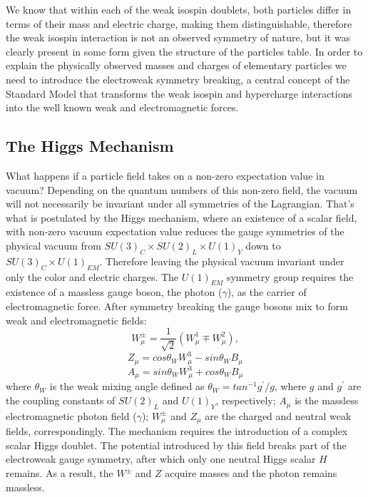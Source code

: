 We know that within each of the weak isospin doublets, both particles 
differ in terms of their
mass and electric charge, making them distinguishable,
 therefore the weak isospin interaction is
 not an observed symmetry of nature, but it was clearly present
in some form given the structure of the particles table. 
In order to explain the physically observed masses and charges of elementary
 particles we need to introduce the electroweak symmetry breaking, a central concept
of the Standard Model that transforms the
weak isospin and hypercharge interactions into the well known weak and electromagnetic forces.



\subsection{The Higgs Mechanism}

What happens if a particle field takes on a non-zero expectation value in vacuum? Depending on the
quantum numbers of this non-zero field, the vacuum will not necessarily be invariant under
all symmetries of the Lagrangian. That's what is postulated by the Higgs mechanism, where
an existence of a scalar field, with non-zero vacuum expectation value
reduces the gauge symmetries of the physical 
vacuum from $SU(3)_C \times SU(2)_L \times U(1)_Y$
down to $SU(3)_C \times U(1)_{EM}$. Therefore leaving the physical vacuum invariant under
only the color and electric charges. 
The $U(1)_{EM}$ symmetry group requires the existence of a massless
gauge boson, the photon ($\gamma$), as the carrier of electromagnetic force.
After symmetry breaking the gauge bosons mix to form weak and electromagnetic fields:
\begin{equation}
W_{\mu}^{\pm}=\frac{1}{\sqrt{2}}\left( W_{\mu}^1 \mp W_{\mu}^{2}\right),
\end{equation}
\begin{equation}
Z_{\mu}=cos\theta_W W_{\mu}^3-sin\theta_W B_{\mu}
\end{equation}
\begin{equation}
A_{\mu}=sin\theta_W W_{\mu}^3+cos\theta_W B_{\mu}
\end{equation}
where $\theta_W$ is the weak mixing angle defined as $\theta_W=tan^{-1} g^{'}/g$, where $g$ 
and $g^{'}$ are the coupling constants of $SU(2)_L$ and $U(1)_Y$, respectively; $A_{\mu}$ is the 
massless electromagnetic photon field ($\gamma$); $W_{\mu}^{\pm}$ and $Z_{\mu}$ are the charged 
and neutral weak fields, correspondingly. The mechanism requires the introduction of a complex
scalar Higgs doublet. The potential introduced by this field breaks part of the electroweak
 gauge symmetry,
after which only one neutral Higgs scalar $H$ remains. As a result, 
the $W^{\pm}$ and $Z$ acquire masses and the photon remains massless.

